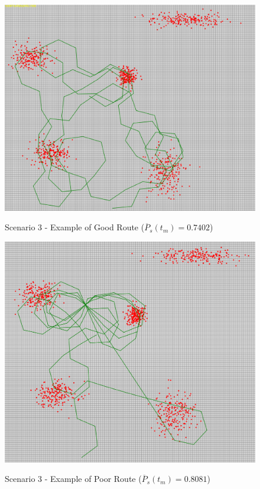\documentclass[10pt,a4paper, oneside, conference]{IEEEtran}
\begin{document}
\begin{figure}[t]
	\caption{Scenario 3 - Example of Good Route ($\overline{P}_s(t_m)=0.7402$)}
	\includegraphics[width=0.7\linewidth]{goodRouteScenario3.png}
	\centering
	\label{fig:scenario3Good}	
	\end{figure}	
	
	\begin{figure}[t]
	\caption{Scenario 3 - Example of Poor Route ($\overline{P}_s(t_m)=0.8081$)}
	\includegraphics[width=0.7\linewidth]{poorRouteScenario3.png}
	\centering
	\label{fig:scenario3Poor}	
	\end{figure}	
	
\end{document}
